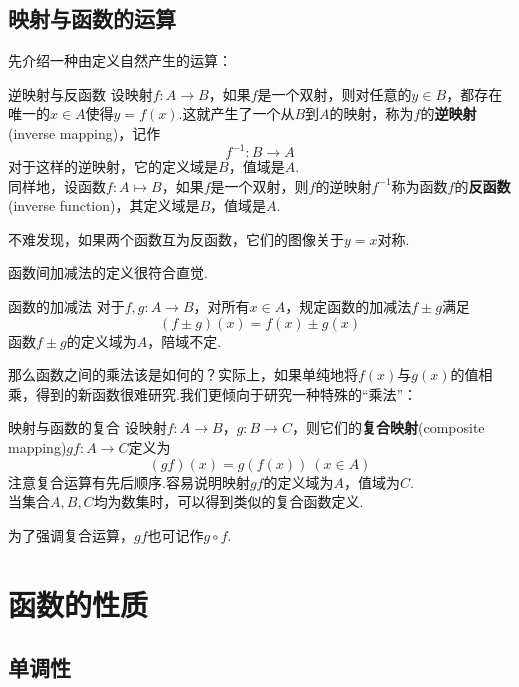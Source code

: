 \documentclass[lang=cn, zihao=5]{elegantbook}
\begin{document}
\subsection{映射与函数的运算}

先介绍一种由定义自然产生的运算：

\begin{definition}{逆映射与反函数} %
    设映射$f:A \to B$，如果$f$是一个双射，则对任意的$y \in B$，都存在唯一的$x \in A$使得$y=f(x)$.这就产生了一个从$B$到$A$的映射，称为$f$的\textbf{逆映射}(inverse mapping)，记作$$f^{-1}:B \to A$$
    对于这样的逆映射，它的定义域是$B$，值域是$A$.\\
    同样地，设函数$f:A \mapsto B$，如果$f$是一个双射，则$f$的逆映射$f^{-1}$称为函数$f$的\textbf{反函数}(inverse function)，其定义域是$B$，值域是$A$.
\end{definition}

不难发现，如果两个函数互为反函数，它们的图像关于$y=x$对称.

函数间加减法的定义很符合直觉.

\begin{definition}{函数的加减法}
	对于$f,g:A \to B$，对所有$x \in A$，规定函数的加减法$f \pm g$满足$$(f \pm g)(x) = f(x) \pm g(x)$$
	函数$f \pm g$的定义域为$A$，陪域不定.
\end{definition}

那么函数之间的乘法该是如何的？实际上，如果单纯地将$f(x)$与$g(x)$的值相乘，得到的新函数很难研究.我们更倾向于研究一种特殊的“乘法”：

\begin{definition}{映射与函数的复合} %
    设映射$f:A \to B$，$g:B \to C$，则它们的\textbf{复合映射}(composite mapping)$gf:A \to C$定义为$$(gf)(x)=g(f(x)) \ (x \in A)$$
    注意复合运算有先后顺序.容易说明映射$gf$的定义域为$A$，值域为$C$.\\
    当集合$A,B,C$均为数集时，可以得到类似的复合函数定义.
\end{definition}
\begin{remark}
	为了强调复合运算，$gf$也可记作$g \circ f$.
\end{remark}

\section{函数的性质}

\subsection{单调性}
\end{document}
